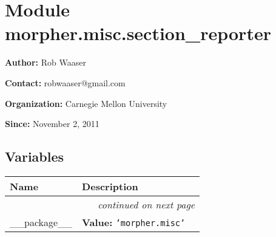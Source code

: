 %
%
%


\section{Module morpher.misc.section\_reporter}

    \label{morpher:misc:section_reporter}
\textbf{Author:} Rob Waaser



\textbf{Contact:} robwaaser@gmail.com



\textbf{Organization:} Carnegie Mellon University



\textbf{Since:} November 2, 2011





  \subsection{Variables}

    \vspace{-1cm}
\hspace{\varindent}\begin{longtable}{|p{\varnamewidth}|p{\vardescrwidth}|l}
\cline{1-2}
\cline{1-2} \centering \textbf{Name} & \centering \textbf{Description}& \\
\cline{1-2}
\endhead\cline{1-2}\multicolumn{3}{r}{\small\textit{continued on next page}}\\\endfoot\cline{1-2}
\endlastfoot\raggedright \_\-\_\-p\-a\-c\-k\-a\-g\-e\-\_\-\_\- & \raggedright \textbf{Value:} 
{\tt \texttt{'}\texttt{morpher.misc}\texttt{'}}&\\
\cline{1-2}
\end{longtable}


